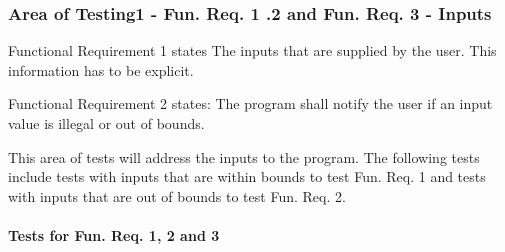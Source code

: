 \documentclass[12pt, titlepage]{article}
\begin{document}
\subsubsection{Area of Testing1 - Fun. Req. 1 .2 and Fun. Req. 3 - Inputs}\label{test_input}

Functional Requirement 1 states The inputs that are supplied by the user. This information has to be
explicit.

Functional Requirement 2 states: The program shall notify the user if an input value is illegal or out of bounds.

This area of tests will address the inputs to the program. The following tests include  tests with inputs that are within bounds to test Fun. Req. 1 and tests with inputs that are out of bounds to test Fun. Req. 2.

\paragraph{Tests for Fun. Req. 1, 2 and 3}
\end{document}

